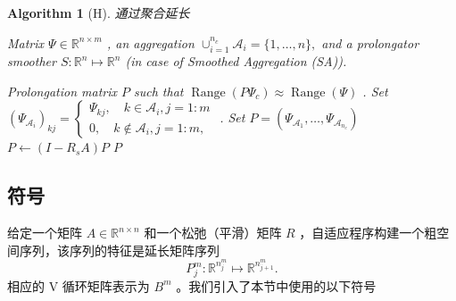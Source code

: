 \documentclass[12pt]{acta_2011xz}
\newcommand{\rs}{\ensuremath{R_s}}
\newtheorem{algorithm}[equation]{Algorithm}
\DeclareMathOperator*{\range}{Range}
\begin{document}
   \begin{algorithm}[H]   \caption{通过聚合延长    \label{a:P-UASA}     }    
   \begin{algorithmic}[1]
Matrix               $\Psi\in \mathbb{R}^{n\times m}$              , an aggregation 
              \(
\cup_{i=1}^{n_c} \mathcal A_i =  \{ 1,\ldots,n \} , 
\)              
and a prolongator smoother               $S:\mathbb{R}^n\mapsto \mathbb{R}^n$               
(in case of Smoothed Aggregation (SA)).   

 Prolongation matrix               $P$               such that               $\range(P\Psi_c) 
\approx \range(\Psi)$              .  
\State Set 
              $(\Psi_{\mathcal{A}_i})_{kj} = 
\begin{cases} 
\Psi_{kj}, \quad k\in \mathcal{A}_i, j=1:m \\ 
0, \quad k\notin \mathcal{A}_i, j=1:m,
\end{cases}$              .
\State Set               $P = (\Psi_{\mathcal A_1 },\ldots,\Psi_{\mathcal A_{n_c} })$              
               $P\leftarrow (I-\rs A) P$                \EndIIf
\State \Return               $P$              
\end{algorithmic}     \end{algorithm}     

   \subsection{符号  }    给定一个矩阵    $A\in \mathbb R^{n\times n}$    和一个松弛（平滑）矩阵    $R$   ，自适应程序构建一个粗空间序列，该序列的特征是延长矩阵序列
   $$
P_j^{m}: \mathbb R^{n_j^m}\mapsto \mathbb R^{n_{j+1}^m}.
$$    相应的 V 循环矩阵表示为    $B^m$    。我们引入了本节中使用的以下符号  
\end{document}
